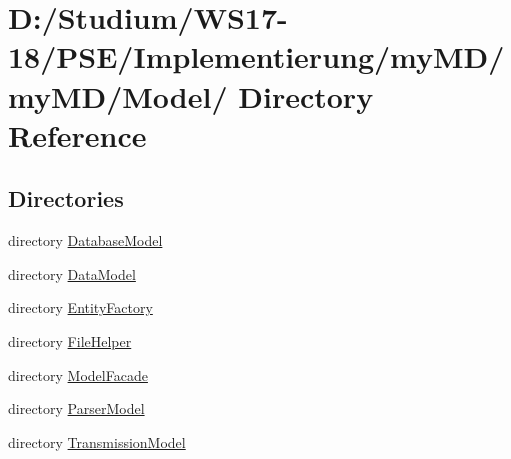 \hypertarget{dir_D_3A_2FStudium_2FWS17_2D18_2FPSE_2FImplementierung_2FmyMD_2FmyMD_2FModel_2F}{
\section{D:/Studium/WS17-18/PSE/Implementierung/my\-MD/my\-MD/Model/ Directory Reference}
\label{dir_D_3A_2FStudium_2FWS17_2D18_2FPSE_2FImplementierung_2FmyMD_2FmyMD_2FModel_2F}
}


\subsection*{Directories}
\begin{CompactItemize}
\item 
directory \hyperlink{dir_D_3A_2FStudium_2FWS17_2D18_2FPSE_2FImplementierung_2FmyMD_2FmyMD_2FModel_2FDatabaseModel_2F}{Database\-Model}
\item 
directory \hyperlink{dir_D_3A_2FStudium_2FWS17_2D18_2FPSE_2FImplementierung_2FmyMD_2FmyMD_2FModel_2FDataModel_2F}{Data\-Model}
\item 
directory \hyperlink{dir_D_3A_2FStudium_2FWS17_2D18_2FPSE_2FImplementierung_2FmyMD_2FmyMD_2FModel_2FEntityFactory_2F}{Entity\-Factory}
\item 
directory \hyperlink{dir_D_3A_2FStudium_2FWS17_2D18_2FPSE_2FImplementierung_2FmyMD_2FmyMD_2FModel_2FFileHelper_2F}{File\-Helper}
\item 
directory \hyperlink{dir_D_3A_2FStudium_2FWS17_2D18_2FPSE_2FImplementierung_2FmyMD_2FmyMD_2FModel_2FModelFacade_2F}{Model\-Facade}
\item 
directory \hyperlink{dir_D_3A_2FStudium_2FWS17_2D18_2FPSE_2FImplementierung_2FmyMD_2FmyMD_2FModel_2FParserModel_2F}{Parser\-Model}
\item 
directory \hyperlink{dir_D_3A_2FStudium_2FWS17_2D18_2FPSE_2FImplementierung_2FmyMD_2FmyMD_2FModel_2FTransmissionModel_2F}{Transmission\-Model}
\end{CompactItemize}
